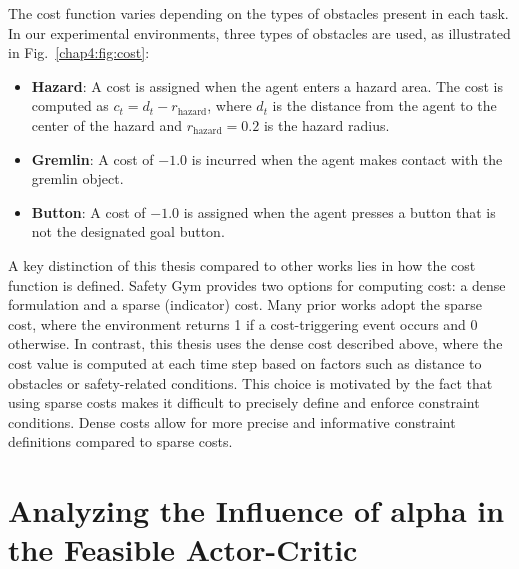 \noindent The cost function varies depending on the types of obstacles present in each task.
In our experimental environments, three types of obstacles are used, as illustrated in Fig.~\ref{chap4:fig:cost}:
\begin{itemize}
    \item \textbf{Hazard}: A cost is assigned when the agent enters a hazard area. The cost is computed as $c_t = d_t - r_{\text{hazard}}$, where $d_t$ is the distance from the agent to the center of the hazard and $r_{\text{hazard}} = 0.2$ is the hazard radius.
    \item \textbf{Gremlin}: A cost of $-1.0$ is incurred when the agent makes contact with the gremlin object.
    \item \textbf{Button}: A cost of $-1.0$ is assigned when the agent presses a button that is not the designated goal button.
\end{itemize}
A key distinction of this thesis compared to other works lies in how the cost function is defined.
Safety Gym provides two options for computing cost: a dense formulation and a sparse (indicator) cost.
Many prior works adopt the sparse cost, where the environment returns 1 if a cost-triggering event occurs and 0 otherwise.
In contrast, this thesis uses the dense cost described above, where the cost value is computed at each time step based on factors such as distance to obstacles or safety-related conditions.
This choice is motivated by the fact that using sparse costs makes it difficult to precisely define and enforce constraint conditions.
Dense costs allow for more precise and informative constraint definitions compared to sparse costs.

\section{Analyzing the Influence of alpha in the Feasible Actor-Critic} \label{chap4:sec:experiments:fac}

